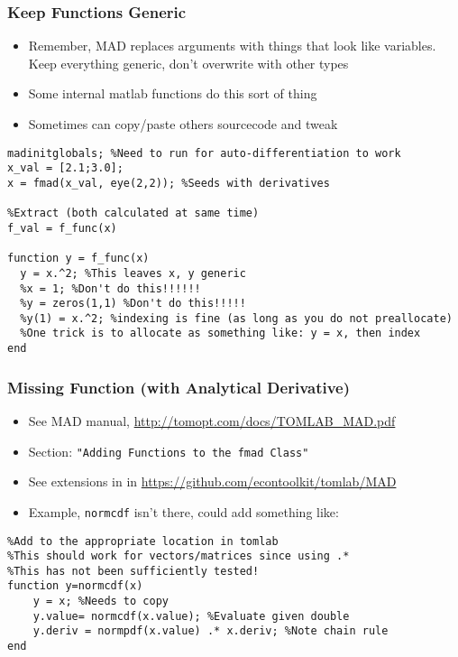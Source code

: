 \documentclass[nofootline]{etk-presentation}
\begin{document}
\begin{frame}[fragile]	\frametitle{Keep Functions Generic}
	\begin{itemize}
		\item Remember, MAD replaces arguments with things that look like variables.  Keep everything generic, don't overwrite with other types
		\item Some internal matlab functions do this sort of thing
		\item Sometimes can copy/paste others sourcecode and tweak
	\end{itemize}

\begin{verbatim}
madinitglobals; %Need to run for auto-differentiation to work
x_val = [2.1;3.0];
x = fmad(x_val, eye(2,2)); %Seeds with derivatives

%Extract (both calculated at same time)
f_val = f_func(x)

function y = f_func(x)
  y = x.^2; %This leaves x, y generic
  %x = 1; %Don't do this!!!!!!
  %y = zeros(1,1) %Don't do this!!!!!
  %y(1) = x.^2; %indexing is fine (as long as you do not preallocate)
  %One trick is to allocate as something like: y = x, then index
end
\end{verbatim}	

\end{frame}

\begin{frame}[fragile]	\frametitle{Missing Function (with Analytical Derivative)}
\begin{itemize}
	\item See MAD manual, \url{http://tomopt.com/docs/TOMLAB_MAD.pdf}
	\item Section: \verb!"Adding Functions to the fmad Class"!
	\item See extensions in in \url{https://github.com/econtoolkit/tomlab/MAD}
	\item Example, \verb!normcdf! isn't there, could add something like:
\end{itemize}

\begin{verbatim}
%Add to the appropriate location in tomlab
%This should work for vectors/matrices since using .*
%This has not been sufficiently tested!
function y=normcdf(x)
	y = x; %Needs to copy		
	y.value= normcdf(x.value); %Evaluate given double 
	y.deriv = normpdf(x.value) .* x.deriv; %Note chain rule
end
\end{verbatim}
\end{frame}
\end{document}

